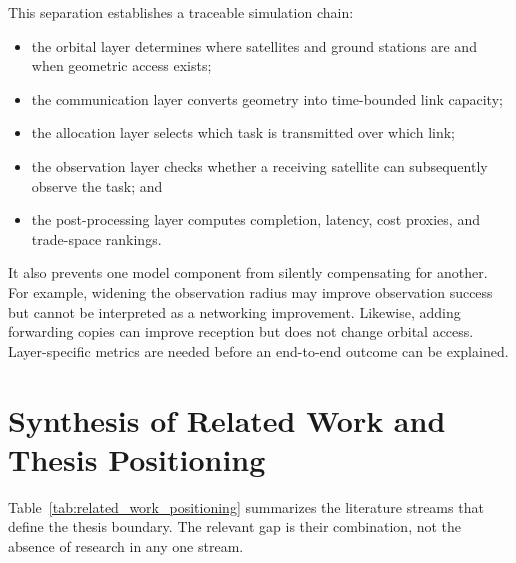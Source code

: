 This separation establishes a traceable simulation chain:
\begin{itemize}
\item the orbital layer determines where satellites and ground stations are and when geometric access exists;
\item the communication layer converts geometry into time-bounded link capacity;
\item the allocation layer selects which task is transmitted over which link;
\item the observation layer checks whether a receiving satellite can subsequently observe the task; and
\item the post-processing layer computes completion, latency, cost proxies, and trade-space rankings.
\end{itemize}

It also prevents one model component from silently compensating for another. For example, widening the observation radius may improve observation success but cannot be interpreted as a networking improvement. Likewise, adding forwarding copies can improve reception but does not change orbital access. Layer-specific metrics are needed before an end-to-end outcome can be explained.

\section{Synthesis of Related Work and Thesis Positioning}

Table~\ref{tab:related_work_positioning} summarizes the literature streams that define the thesis boundary. The relevant gap is their combination, not the absence of research in any one stream.

